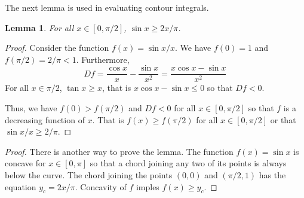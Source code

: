 \documentclass{article}
\theoremstyle{plain}
\numberwithin{thm}{section}
\theoremstyle{plain}
\numberwithin{prop}{section}
\theoremstyle{plain}
\newtheorem{lem}{Lemma}
\numberwithin{prop}{section}
\theoremstyle{definition}
\numberwithin{defn}{section}
\theoremstyle{remark}
\numberwithin{equation}{section}
\begin{document}
The next lemma is used in evaluating contour integrals.
\begin{lem}\label{s1al1}
For all $x \in [0, \pi/2]$, $\sin x \ge 2x/\pi$.
\end{lem}
\begin{proof}
Consider the function $f(x) = \sin x/x$. We have $f(0) = 1$ and $f(\pi/2) = 
2/\pi < 1$. Furthermore,
\[
Df = \frac{\cos x}{x} - \frac{\sin x}{x^2} = \frac{x\cos x - \sin x}{x^2}
\]
For all $x \in \pi/2$, $\tan x \ge x$, that is $x\cos x - \sin x \le 0$ so that
$Df < 0$.

Thus, we have $f(0) > f(\pi/2)$ and $Df < 0$ for all $x \in [0, \pi/2]$ so that
$f$ is a decreasing function of $x$. That is $f(x) \ge f(\pi/2)$ for all $x \in
[0, \pi/2]$ or that $\sin x/x \ge 2/\pi$.
\end{proof}
\begin{proof}
There is another way to prove the lemma. The function $f(x) = \sin x$ is concave
for $x \in [0, \pi]$ so that a chord joining any two of its points is always
below the curve. The chord joining the points $(0, 0)$ and $(\pi/2 ,1)$ has
the equation $y_c = 2x/\pi$. Concavity of $f$ imples $f(x) \ge y_c$.
\end{proof}
\end{document}
